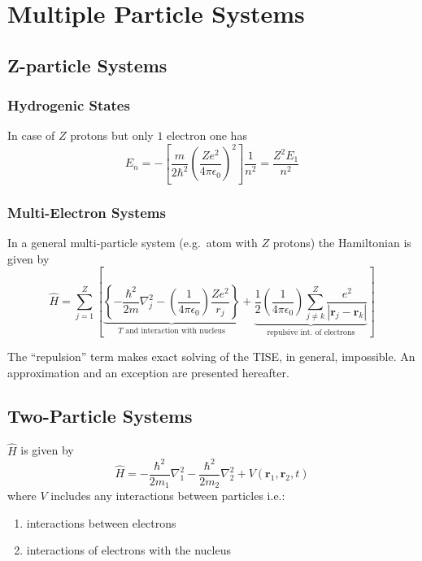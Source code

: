 \section{Multiple Particle Systems}
\subsection{Z-particle Systems}
\subsubsection{Hydrogenic States}
In case of $Z$ protons but only $1$ electron one has
\begin{equation*}
    E_n = -\left[\frac{m}{2\hbar^2}{\left(\frac{Z e^2}{4\pi\epsilon_0}\right)}^2\right]\frac{1}{n^2} = \frac{Z^2 E_1}{n^2}
\end{equation*}
\subsubsection{Multi-Electron Systems}
In a general multi-particle system (e.g.\ atom with $Z$ protons) the Hamiltonian is given by
{\small
\begin{equation*}
    \widehat{H} = \sum_{j=1}^{Z} \left[ \underbrace{ \left\{-\frac{\hbar^{2}}{2m}\nabla_{j}^{2}-\left(\frac{1}{4\pi \epsilon_{0}}\right)\frac{Ze^{2}}{r_{j}}\right\}}_{T\text{ and interaction with nucleus}}  +              \underbrace{\frac{1}{2}\left(\frac{1}{4\pi \epsilon_{0}}\right)\sum_{j\neq k}^{Z}\frac{e^{2}}{\left|\mathbf{r}_{j}-\mathbf{r}_{k}\right|}}_{\text{repulsive int.\ of electrons}}\right]
\end{equation*}
}
    
The ``repulsion'' term makes exact solving of the TISE, in general, impossible. An approximation and an exception are presented hereafter.

\subsection{Two-Particle Systems}
$\widehat{H}$ is given by
\begin{equation*}
    \widehat{H}=-\frac{\hbar^{2}}{2m_{1}}\nabla_{1}^{2}-\frac{\hbar^{2}}{2m_{2}}\nabla_{2}^{2}+V(\mathbf{r}_{1},\mathbf{r}_{2},t)
\end{equation*}
where $V$ includes any interactions between particles i.e.:
\begin{enumerate}
    \item interactions between  electrons
    \item interactions of electrons with the nucleus
\end{enumerate}

